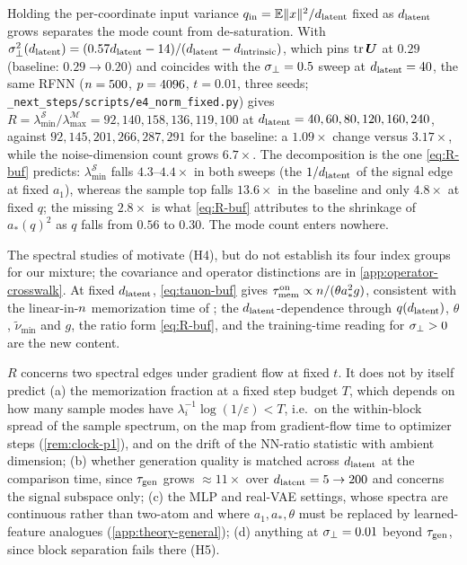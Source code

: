 \begin{remark}\label{rem:normfixed-buf}
Holding the per-coordinate input variance $q_{\rm in}=\mathbb{E}\|x\|^2/d_{\mathrm{latent}}$ fixed as $d_{\mathrm{latent}}$ grows separates the mode count from de-saturation. With $\sigma_{\perp}^2(d_{\mathrm{latent}})=(0.57d_{\mathrm{latent}}-14)/(d_{\mathrm{latent}}-d_{\mathrm{intrinsic}})$, which pins $\operatorname{tr}\bm{U}$ at $0.29$ (baseline: $0.29\to0.20$) and coincides with the $\sigma_{\perp}=0.5$ sweep at $d_{\mathrm{latent}}=40$, the same RFNN ($n=500$, $p=4096$, $t=0.01$, three seeds; \texttt{\_next\_steps/scripts/e4\_norm\_fixed.py}) gives $R=\lambda^{\mathcal S}_{\min}/\lambda^{\mathcal M}_{\max}=92,140,158,136,119,100$ at $d_{\mathrm{latent}}=40,60,80,120,160,240$, against $92,145,201,266,287,291$ for the baseline: a $1.09\times$ change versus $3.17\times$, while the noise-dimension count grows $6.7\times$. The decomposition is the one \eqref{eq:R-buf} predicts: $\lambda^{\mathcal S}_{\min}$ falls $4.3$--$4.4\times$ in both sweeps (the $1/d_{\mathrm{latent}}$ of the signal edge at fixed $a_1$), whereas the sample top falls $13.6\times$ in the baseline and only $4.8\times$ at fixed $q$; the missing $2.8\times$ is what \eqref{eq:R-buf} attributes to the shrinkage of $a_*(q)^2$ as $q$ falls from $0.56$ to $0.30$. The mode count enters nowhere.
\end{remark}


\begin{remark}\label{rem:prior-buf}
The spectral studies of \citet{bonnaire2025,george2025dsm} motivate (H4), but do not establish its four index groups for our mixture; the covariance and operator distinctions are in \cref{app:operator-crosswalk}. At fixed $d_{\mathrm{latent}}$, \eqref{eq:tauon-buf} gives $\tau_{\mathrm{mem}}^{\rm on}\propto n/(\theta a_*^2g)$, consistent with the linear-in-$n$ memorization time of \citet{bonnaire2025}; the $d_{\mathrm{latent}}$-dependence through $q(d_{\mathrm{latent}})$, $\theta$, $\tilde\nu_{\min}$ and $g$, the ratio form \eqref{eq:R-buf}, and the training-time reading for $\sigma_{\perp}>0$ are the new content.
\end{remark}

\begin{remark}\label{rem:notpredicted-buf}
$R$ concerns two spectral edges under gradient flow at fixed $t$. It does not by itself predict (a) the memorization fraction at a fixed step budget $T$, which depends on how many sample modes have $\lambda_i^{-1}\log(1/\varepsilon)<T$, i.e.\ on the within-block spread of the sample spectrum, on the map from gradient-flow time to optimizer steps (\cref{rem:clock-p1}), and on the drift of the NN-ratio statistic with ambient dimension; (b) whether generation quality is matched across $d_{\mathrm{latent}}$ at the comparison time, since $\tau_{\mathrm{gen}}$ grows $\approx11\times$ over $d_{\mathrm{latent}}=5\to200$ and concerns the signal subspace only; (c) the MLP and real-VAE settings, whose spectra are continuous rather than two-atom and where $a_1,a_*,\theta$ must be replaced by learned-feature analogues (\cref{app:theory-general}); (d) anything at $\sigma_{\perp}=0.01$ beyond $\tau_{\mathrm{gen}}$, since block separation fails there (H5).
\end{remark}

